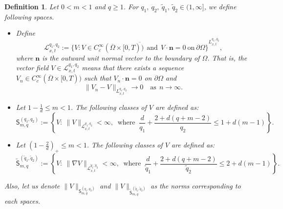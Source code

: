 \documentclass{amsart}
\newtheorem{defn}{Definition}[section]
\numberwithin{equation}{section}
\begin{document}
\begin{defn}\label{D:Serrin}
Let $0<m<1$ and $q\geq 1$. For $q_1, \ q_2, \ \tilde{q}_1, \ \tilde{q}_2 \in (1, \infty]$, we define following spaces.

\begin{itemize}
\item[(i)]Define
\[
\mathcal{L}_{x,t}^{q_1, q_2}:= \overline{\{V : V \in C_c^\infty(\overline{\Omega} \times[0, T)) ~~\mbox{and}~~ V\cdot \textbf{n} = 0 ~ \mbox{on} ~ \partial \Omega\}}^{L_{x,t}^{q_1, q_2}},
\]
where $\textbf{n}$ is the outward unit normal vector to the boundary of $\Omega$.
That is, the vector field $ V \in \mathcal{L}_{x,t}^{q_1, q_2}$ means that there exists a sequence $V_n  \in C_c^\infty(\overline{\Omega} \times[0, T)) $ such that
$ V_n \cdot \textbf{n} = 0$ on $\partial \Omega$ and
\[
\|V_n-V \|_{L_{x,t}^{q_1, q_2}} \rightarrow 0 \quad \mbox{as} ~~ n \rightarrow \infty.
\]

\item[(ii)] Let $1 - \frac{1}{d}  \leq m < 1$. The following classes of $V$ are defined as:
\begin{equation*}\label{Vclass:SS}
 \mathsf{S}_{m,q}^{(q_1, q_2)}:= \left\{ V: \ \|V\|_{\mathcal{L}^{q_1, q_2}_{x,t}} < \infty, \ \text{ where } \ \frac{d}{q_1} + \frac{2 + d(q+m-2)}{q_2} \leq 1 + d(m-1) \right\}.
\end{equation*}

\item[(iii)] Let $\left( 1 - \frac{2}{d} \right)_{+} \leq m < 1$. The following classes of $V$ are defined as:
\begin{equation*}\label{Vclass:tildeSS}
 \tilde{\mathsf{S}}_{m,q}^{(\tilde{q}_1, \tilde{q}_2)}:= \left\{ V: \ \|\nabla V\|_{\mathcal{L}^{\tilde{q}_1, \tilde{q}_2}_{x,t}} < \infty, \ \text{ where } \ \frac{d}{\tilde{q}_1} + \frac{2 + d(q+m-2)}{\tilde{q}_2} \leq 2 + d(m-1) \right\}.
\end{equation*}
\end{itemize}
Also, let us denote $\|V\|_{\mathsf{S}_{m,q}^{(q_1, q_2)}}$ and $\|V\|_{\tilde{\mathsf{S}}_{m,q}^{(\tilde{q}_1, \tilde{q}_2)}}$ as the norms corresponding to each spaces.
\end{defn}
\end{document}

